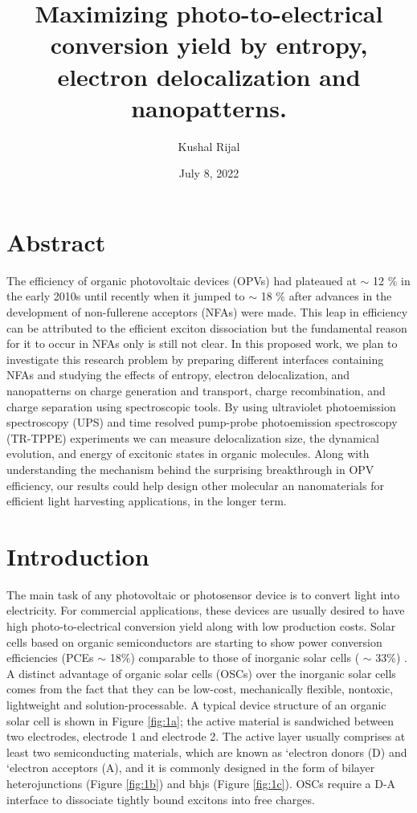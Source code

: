 \documentclass[12pt]{article}
\title{Maximizing photo-to-electrical conversion yield by entropy, electron delocalization and nanopatterns.}
\author{Kushal Rijal}
\date{July 8, 2022}
\begin{document}
\maketitle
\section*{\hfil Abstract\hfil}
The efficiency of organic photovoltaic devices (OPVs) had plateaued at $\sim$ 12 \% in the early 2010s until recently when it jumped to $\sim$ 18 \% after advances in the development of non-fullerene acceptors (NFAs) were made. This leap in efficiency can be attributed to the efficient exciton dissociation but the fundamental reason for it to occur in NFAs only is still not clear. In this proposed work, we plan to investigate this research problem by preparing different interfaces containing NFAs and studying the effects of entropy, electron delocalization, and nanopatterns on charge generation and transport, charge recombination, and charge separation using spectroscopic tools. By using ultraviolet photoemission spectroscopy (UPS) and time resolved pump-probe photoemission spectroscopy (TR-TPPE) experiments we can measure delocalization size, the dynamical evolution, and energy of excitonic states in organic molecules. Along with understanding the mechanism behind the surprising breakthrough in OPV efficiency, our results could help design other molecular an nanomaterials for efficient light harvesting applications, in the longer term. 

\section{Introduction}
The main task of any photovoltaic or photosensor device is to convert light into electricity. For commercial applications, these devices are usually desired to have high photo-to-electrical conversion yield along with low production costs. Solar cells based on organic semiconductors are starting to show power conversion efficiencies (PCEs $\sim$ 18$\%$) comparable to those of inorganic solar cells ( $\sim$ 33$\%$) \cite{hou2018organic,cariou2018iii}. A distinct advantage of organic solar cells (OSCs) over the inorganic solar cells comes from the fact that they can be low-cost, mechanically flexible, nontoxic, lightweight and solution-processable. A typical device structure of an organic solar cell is shown in Figure \ref{fig:1a}; the active material is sandwiched between two electrodes, electrode 1 and electrode 2. The active layer usually comprises at least two semiconducting materials, which are known as \lq{electron donors} (D) and \lq{electron acceptors} (A), and it is commonly designed in the form of bilayer heterojunctions (Figure \ref{fig:1b}) and \acrfull{bhjs} (Figure \ref{fig:1c}). OSCs require a D-A interface to dissociate tightly bound excitons into free charges.
 
\end{document}
